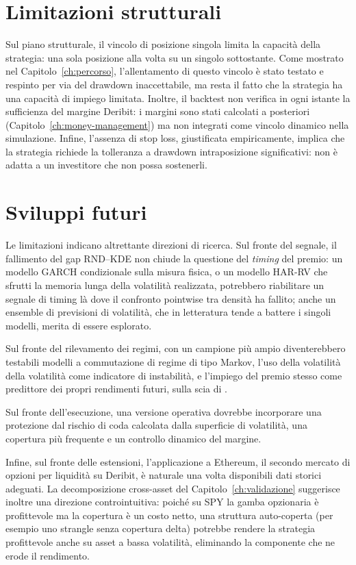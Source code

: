 \section{Limitazioni strutturali}
\label{sec:lim-strutturali}

Sul piano strutturale, il vincolo di posizione singola limita la capacità
della strategia: una sola posizione alla volta su un singolo sottostante.
Come mostrato nel Capitolo~\ref{ch:percorso}, l'allentamento di questo
vincolo è stato testato e respinto per via del drawdown inaccettabile, ma
resta il fatto che la strategia ha una capacità di impiego limitata. Inoltre,
il backtest non verifica in ogni istante la sufficienza del margine Deribit:
i margini sono stati calcolati a posteriori (Capitolo~\ref{ch:money-management})
ma non integrati come vincolo dinamico nella simulazione. Infine, l'assenza
di stop loss, giustificata empiricamente, implica che la strategia richiede
la tolleranza a drawdown intraposizione significativi: non è adatta a un
investitore che non possa sostenerli.

\section{Sviluppi futuri}
\label{sec:lim-sviluppi}

Le limitazioni indicano altrettante direzioni di ricerca. Sul fronte del
segnale, il fallimento del gap RND--KDE non chiude la questione del
\emph{timing} del premio: un modello GARCH condizionale sulla misura fisica,
o un modello HAR-RV \citep{corsi2009simple} che sfrutti la memoria lunga
della volatilità realizzata, potrebbero riabilitare un segnale di timing là
dove il confronto pointwise tra densità ha fallito; anche un ensemble di
previsioni di volatilità, che in letteratura tende a battere i singoli
modelli, merita di essere esplorato.

Sul fronte del rilevamento dei regimi, con un campione più ampio
diventerebbero testabili modelli a commutazione di regime di tipo Markov,
l'uso della volatilità della volatilità come indicatore di instabilità, e
l'impiego del premio stesso come predittore dei propri rendimenti futuri,
sulla scia di \citet{bollerslev2009expected}.

Sul fronte dell'esecuzione, una versione operativa dovrebbe incorporare una
protezione dal rischio di coda calcolata dalla superficie di volatilità, una
copertura più frequente e un controllo dinamico del margine.

Infine, sul fronte delle estensioni, l'applicazione a Ethereum, il secondo
mercato di opzioni per liquidità su Deribit, è naturale una volta disponibili
dati storici adeguati. La decomposizione cross-asset del
Capitolo~\ref{ch:validazione} suggerisce inoltre una direzione controintuitiva:
poiché su SPY la gamba opzionaria è profittevole ma la copertura è un costo
netto, una struttura auto-coperta (per esempio uno strangle senza copertura
delta) potrebbe rendere la strategia profittevole anche su asset a bassa
volatilità, eliminando la componente che ne erode il rendimento.
